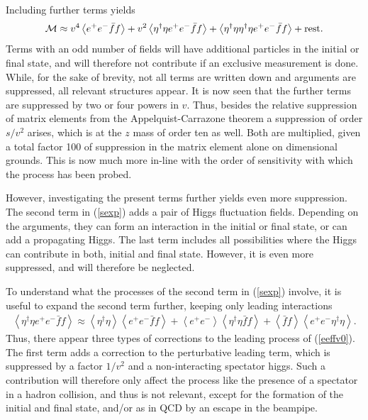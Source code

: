\documentclass[final,12pt]{article}
\newcommand*{\no}{\noindent}
\newcommand*{\bea}{\begin{eqnarray}}
\newcommand*{\eea}{\end{eqnarray}}
\newcommand*{\be}{\begin{equation}}
\newcommand*{\ee}{\end{equation}}
\newcommand*{\pref}[1]{(\ref{#1})}
\newcommand*{\1}{1\!\!\!\bot}
\newcommand*{\la}{\left\langle}
\newcommand*{\ra}{\right\rangle}
\begin{document}
Including further terms yields \cite{Egger:2017tkd}
\be
{\cal M}\approx v^4\la e^+e^-\bar{f}f\ra+v^2\la\eta^\dagger\eta e^+e^-\bar{f}f\ra+\la\eta^\dagger\eta\eta^\dagger\eta e^+e^-\bar{f}f\ra + \text{rest}\label{sexp}.
\ee
\no Terms with an odd number of fields will have additional particles in the initial or final state, and will therefore not contribute if an exclusive measurement is done. While, for the sake of brevity, not all terms are written down and arguments are suppressed, all relevant structures appear. It is now seen that the further terms are suppressed by two or four powers in $v$. Thus, besides the relative suppression of matrix elements from the Appelquist-Carrazone theorem a suppression of order $s/v^2$ arises, which is at the $z$ mass of order ten as well. Both are multiplied, given a total factor 100 of suppression in the matrix element alone on dimensional grounds. This is now much more in-line with the order of sensitivity with which the process has been probed.

However, investigating the present terms further yields even more suppression. The second term in \pref{sexp} adds a pair of Higgs fluctuation fields. Depending on the arguments, they can form an interaction in the initial or final state, or can add a propagating Higgs. The last term includes all possibilities where the Higgs can contribute in both, initial and final state. However, it is even more suppressed, and will therefore be neglected.

To understand what the processes of the second term in \pref{sexp} involve, it is useful to expand the second term further, keeping only leading interactions \cite{Egger:2017tkd}
\bea
\la\eta^\dagger\eta e^+e^-\bar{f}f\ra\approx\la\eta^\dagger\eta\ra\la e^+e^-\bar{f}f\ra  +  \la e^+e^-\ra\la\eta^\dagger\eta\bar{f}f\ra+  \la\bar{f}f\ra\la e^+e^-\eta^\dagger\eta\ra\label{sexp2}.
\eea
\no Thus, there appear three types of corrections to the leading process of \pref{eeffv0}. The first term adds a correction to the perturbative leading term, which is suppressed by a factor $1/v^2$ and a non-interacting spectator higgs. Such a contribution will therefore only affect the process like the presence of a spectator in a hadron collision, and thus is not relevant, except for the formation of the initial and final state, and/or as in QCD by an escape in the beampipe.
\end{document}
